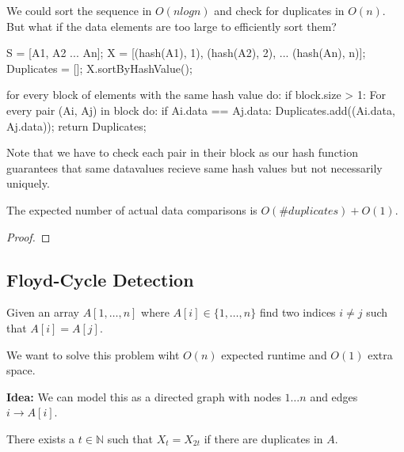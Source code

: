 \begin{remark}
	We could sort the sequence in $O(n log n)$ and check for duplicates in $O(n)$. But what if the data elements are too large to efficiently sort them?
\end{remark}

\begin{algorithm}
	S = [A1, A2 ... An];
	X = [(hash(A1), 1), (hash(A2), 2), ... (hash(An), n)];
	Duplicates = [];
	X.sortByHashValue();

	for every block of elements with the same hash value do:
	if block.size > 1:
	For every pair (Ai, Aj) in block do:
	if Ai.data == Aj.data:
	Duplicates.add((Ai.data, Aj.data));
	return Duplicates;
\end{algorithm}

\begin{remark}
	Note that we have to check each pair in their block as our hash function guarantees that same datavalues recieve same hash values but not necessarily uniquely.
\end{remark}

\begin{theorem}
	The expected number of actual data comparisons is $O(\#duplicates) + O(1)$.
\end{theorem}

\begin{proof}

\end{proof}

\subsection{Floyd-Cycle Detection}

\begin{definition}
	Given an array $A[1, \dots, n]$ where $A[i] \in \{1, \dots, n\}$ find two indices $i \neq j$ such that $A[i] = A[j]$.
\end{definition}

\begin{remark}
	We want to solve this problem wiht $O(n)$ expected runtime and $O(1)$ extra space.
\end{remark}

\begin{remark}
	\textbf{Idea:} We can model this as a directed graph with nodes $1 \dots n$ and edges $i \to A[i]$.
\end{remark}

\begin{lemma}
	There exists a $t \in \mathbb{N}$ such that $X_t = X_{2t}$ if there are duplicates in $A$.
\end{lemma}

